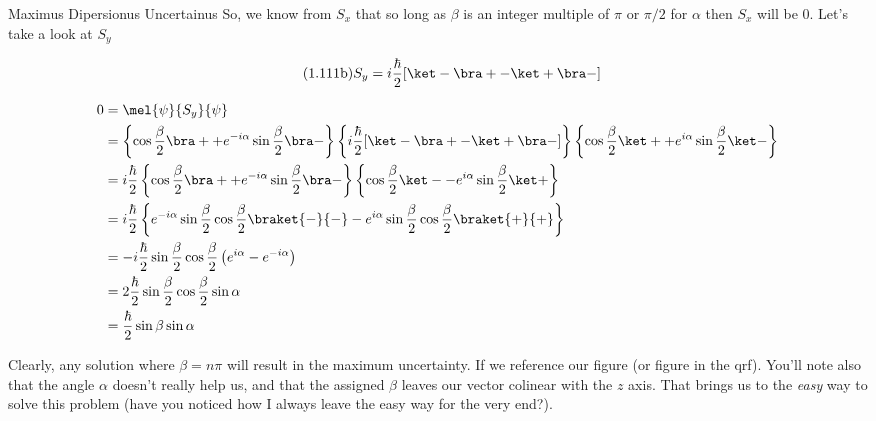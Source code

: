 \begin{answer}
\begin{answerpart}{Maximus Dipersionus Uncertainus}
    So, we know from $S_x$ that so long as $\beta$ is an integer
    multiple of $\pi$ or $\pi/2$ for $\alpha$ then $S_x$ will be 0.
    Let's take a look at $S_y$

    \begin{equation}
      \tag{1.111b}
      S_y = i \frac{\hbar}{2} [\ket - \bra + - \ket + \bra - ]
    \end{equation}

    \begin{equation}
      \begin{split}
        0
        &= \mel{\psi}{S_y}{\psi}
        \\
        &=
        \left\{\cos{\frac{\beta}{2}} \bra + + e^{-i\alpha}\sin{\frac{\beta}{2}} \bra -\right\}
        \left\{i \frac{\hbar}{2} [\ket - \bra + - \ket + \bra - ]\right\}
        \left\{\cos{\frac{\beta}{2}} \ket + + e^{i\alpha}\sin{\frac{\beta}{2}} \ket -\right\}
        \\
        &=
        i\frac{\hbar}{2}
        \left\{\cos{\frac{\beta}{2}} \bra + + e^{-i\alpha}\sin{\frac{\beta}{2}} \bra -\right\}
        \left\{\cos{\frac{\beta}{2}} \ket - - e^{i\alpha}\sin{\frac{\beta}{2}} \ket +\right\}
        \\
        &=
        i\frac{\hbar}{2}\left\{
        e^{-i\alpha}\sin{\frac{\beta}{2}}\cos{\frac{\beta}{2}}\braket{-}{-}
        -
        e^{i\alpha}\sin{\frac{\beta}{2}}\cos{\frac{\beta}{2}}\braket{+}{+}
        \right\}
        \\
        &=
        -i\frac{\hbar}{2}
        \sin{\frac{\beta}{2}}\cos{\frac{\beta}{2}}
        \left(e^{i\alpha} - e^{-i\alpha}\right)
        \\
        &=
        2\frac{\hbar}{2}
        \sin{\frac{\beta}{2}}\cos{\frac{\beta}{2}}
        \sin{\alpha}
        \\
        &=
        \frac{\hbar}{2}
        \sin{\beta}
        \sin{\alpha}
        \\
      \end{split}
    \end{equation}

    Clearly, any solution where $\beta = n\pi$ will result in the
    maximum uncertainty.  If we reference our figure
     (or figure  in the \ac{qrf}).
    You'll note also that the angle $\alpha$ doesn't really help us,
    and that the assigned $\beta$ leaves our vector colinear with the
    $z$ axis.  That brings us to the \emph{easy} way to solve this
    problem (have you noticed how I always leave the easy way for the
    very end?).


\end{answerpart}
\end{answer}
